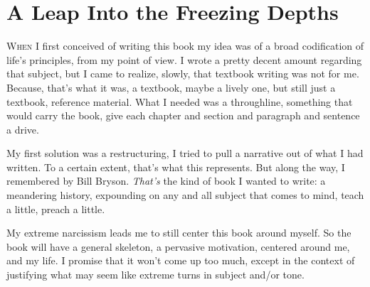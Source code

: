 \documentclass[./butidigress.tex]{subfiles}
\begin{document}
\chapter{A Leap Into the Freezing Depths}\label{chap:aleap}
\newpage
{}
\lettrine{W}{hen} I first conceived of writing this book my idea was of a broad codification of life's principles, from my point of view.
I wrote a pretty decent amount regarding that subject, but I came to realize, slowly, that textbook writing was not for me.
Because, that's what it was, a textbook, maybe a lively one, but still just a textbook, reference material.
What I needed was a throughline, something that would carry the book, give each chapter and section and paragraph and sentence a drive.

My first solution was a restructuring, I tried to pull a narrative out of what I had written.
To a certain extent, that's what this represents.
But along the way, I remembered  by Bill Bryson.
\emph{That's} the kind of book I wanted to write: a meandering history, expounding on any and all subject that comes to mind, teach a little, preach a little.

\entryskip

My extreme narcissism leads me to still center this book around myself.
So the book will have a general skeleton, a pervasive motivation, centered around me, and my life.
I promise that it won't come up too much, except in the context of justifying what may seem like extreme turns in subject and\slash or tone.
\end{document}
